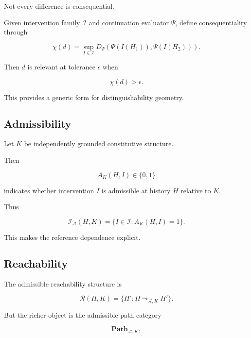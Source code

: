 \documentclass[11pt]{article}
\theoremstyle{remark}
\newcommand{\Adm}{\mathcal{A}}
\newcommand{\Reach}{\mathcal{R}}
\begin{document}
Not every difference is consequential.

Given intervention family $\mathcal{I}$ and continuation evaluator $\Psi$, define consequentiality through

\begin{equation}
\chi(d)
=
\sup_{I\in\mathcal{I}}
D_\Psi
\left(
\Psi(I(H_1)),
\Psi(I(H_2))
\right).
\end{equation}

Then $d$ is relevant at tolerance $\epsilon$ when

\begin{equation}
\chi(d)>\epsilon.
\end{equation}

This provides a generic form for distinguishability geometry.

\subsection{Admissibility}

Let $K$ be independently grounded constitutive structure.

Then

\begin{equation}
A_K(H,I)\in\{0,1\}
\end{equation}

indicates whether intervention $I$ is admissible at history $H$ relative to $K$.

Thus

\begin{equation}
\mathcal{I}_{\Adm}(H,K)
=
\{
I\in\mathcal{I}:
A_K(H,I)=1
\}.
\end{equation}

This makes the reference dependence explicit.

\subsection{Reachability}

The admissible reachability structure is

\begin{equation}
\Reach(H,K)
=
\{
H':
H\leadsto_{\Adm,K}H'
\}.
\end{equation}

But the richer object is the admissible path category

\begin{equation}
\mathbf{Path}_{\Adm,K},
\end{equation}
\end{document}
